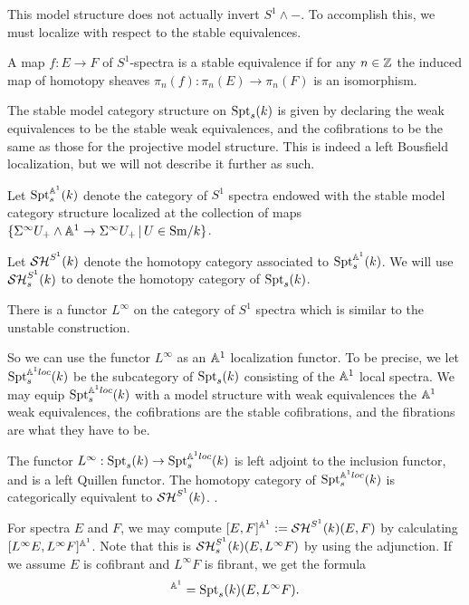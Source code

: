 \documentclass{amsart}%
\begin{document}
This model structure does not actually invert $S^1 \wedge -$. To
accomplish this, we must localize with respect to the stable
equivalences.

\begin{definition}
  A map $f : E \to F$ of $S^1$-spectra is a stable equivalence if for
  any $n\in \mathbb{Z}$ the induced map of homotopy sheaves
  $\pi_n(f) : \pi_n(E) \to \pi_n(F)$ is an isomorphism. 

  The stable model category structure on $\mathrm{Spt}_s(k)$ is given by
  declaring the weak equivalences to be the stable weak equivalences,
  and the cofibrations to be the same as those for the projective
  model structure. This is indeed a left Bousfield localization, but
  we will not describe it further as such. 
\end{definition}


\begin{definition}
  Let $\mathrm{Spt}_s^{\mathbb{A}^1}(k)$ denote the category of $S^1$ spectra
  endowed with the stable model category structure localized at the
  collection of maps
  $\{\Sigma^{\infty} U_+ \wedge \mathbb{A}^1 \to \Sigma^{\infty}U_+ \, \vert \, U
  \in \mathrm{Sm}/k\}$. 

  Let $\mathcal{SH}^{S^1}(k)$ denote the homotopy category associated to
  $\mathrm{Spt}_s^{\mathbb{A}^1}(k)$. We will use $\mathcal{SH}_s^{S^1}(k)$ to denote the
  homotopy category of $\mathrm{Spt}_s(k)$.
\end{definition}

\begin{remark}
  There is a functor $L^{\infty}$ on the category of $S^1$ spectra
  which is similar to the unstable construction.

  So we can use the functor $L^{\infty}$ as an $\mathbb{A}^1$ localization
  functor. To be precise, we let $\mathrm{Spt}_s^{\mathbb{A}^1loc}(k)$ be the
  subcategory of $\mathrm{Spt}_s(k)$ consisting of the $\mathbb{A}^1$ local
  spectra. We may equip $\mathrm{Spt}_s^{\mathbb{A}^1loc}(k)$ with a model structure
  with weak equivalences the $\mathbb{A}^1$ weak equivalences, the
  cofibrations are the stable cofibrations, and the fibrations are
  what they have to be.

  The functor $L^{\infty} : \mathrm{Spt}_s(k) \to \mathrm{Spt}_s^{\mathbb{A}^1loc}(k)$ is
  left adjoint to the inclusion functor, and is a left Quillen
  functor. The homotopy category of $\mathrm{Spt}_s^{\mathbb{A}^1loc}(k)$ is
  categorically equivalent to $\mathcal{SH}^{S^1}(k)$. \cite[Corollary
  4.2.3]{Mor05}.

  For spectra $E$ and $F$, we may compute
  $[E,F]^{\mathbb{A}^1}:= \mathcal{SH}^{S^1}(k)(E,F)$ by calculating
  $[L^{\infty} E, L^{\infty} F]^{\mathbb{A}^1}$. Note that this is
  $\mathcal{SH}^{S^1}_s(k)(E,L^{\infty}F)$ by using the adjunction. If we
  assume $E$ is cofibrant and $L^{\infty}F$ is fibrant, we get the
  formula
  \begin{equation*}
    [E,F]^{\bbA^1} = \Spt_s(k)(E,L^{\infty}F).
  \end{equation*}
\end{remark}
\end{document}

